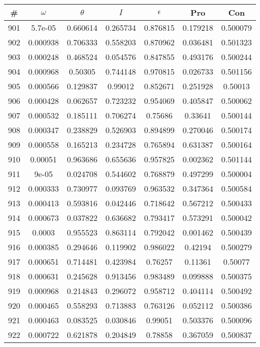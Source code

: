 \newpage
\begin{table}
\begin{tabular}{c|c|c|c|c|c|c}
\# & $\omega$ & $\theta$ & $I$ & $\epsilon$ & Pro & Con\\
\hline
901 & 5.7e-05 & 0.660614 & 0.265734 & 0.876815 & 0.179218 & 0.500079\\
902 & 0.000938 & 0.706333 & 0.558203 & 0.870962 & 0.036481 & 0.501323\\
903 & 0.000248 & 0.468524 & 0.054576 & 0.847855 & 0.493176 & 0.500244\\
904 & 0.000968 & 0.50305 & 0.744148 & 0.970815 & 0.026733 & 0.501156\\
905 & 0.000566 & 0.129837 & 0.99012 & 0.852671 & 0.251928 & 0.50013\\
906 & 0.000428 & 0.062657 & 0.723232 & 0.954069 & 0.405847 & 0.500062\\
907 & 0.000532 & 0.185111 & 0.706274 & 0.75686 & 0.33641 & 0.500144\\
908 & 0.000347 & 0.238829 & 0.526903 & 0.894899 & 0.270046 & 0.500174\\
909 & 0.000558 & 0.165213 & 0.234728 & 0.765894 & 0.631387 & 0.500164\\
910 & 0.00051 & 0.963686 & 0.655636 & 0.957825 & 0.002362 & 0.501144\\
911 & 9e-05 & 0.024708 & 0.544602 & 0.768879 & 0.497299 & 0.500004\\
912 & 0.000333 & 0.730977 & 0.093769 & 0.963532 & 0.347364 & 0.500584\\
913 & 0.000413 & 0.593816 & 0.042446 & 0.718642 & 0.567212 & 0.500433\\
914 & 0.000673 & 0.037822 & 0.636682 & 0.793417 & 0.573291 & 0.500042\\
915 & 0.0003 & 0.955523 & 0.863114 & 0.792042 & 0.001462 & 0.500439\\
916 & 0.000385 & 0.294646 & 0.119902 & 0.986022 & 0.42194 & 0.500279\\
917 & 0.000651 & 0.714481 & 0.423984 & 0.76257 & 0.11361 & 0.50077\\
918 & 0.000631 & 0.245628 & 0.913456 & 0.983489 & 0.099888 & 0.500375\\
919 & 0.000968 & 0.214843 & 0.296072 & 0.958712 & 0.404114 & 0.500492\\
920 & 0.000465 & 0.558293 & 0.713883 & 0.763126 & 0.052112 & 0.500386\\
921 & 0.000463 & 0.083525 & 0.030846 & 0.99051 & 0.503376 & 0.500096\\
922 & 0.000722 & 0.621878 & 0.204849 & 0.78858 & 0.367059 & 0.500837\\

\end{tabular}
\end{table}
